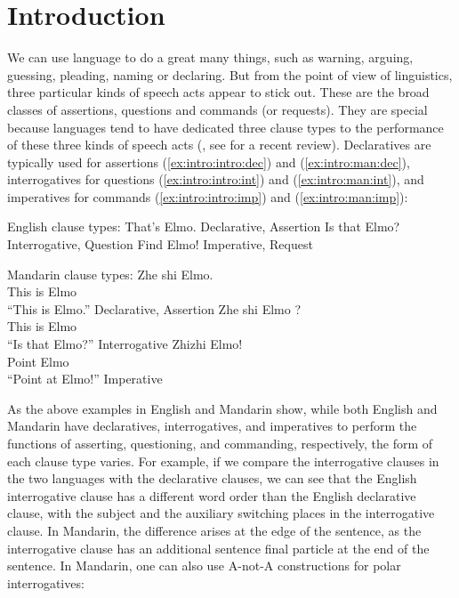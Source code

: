 \chapter{Introduction}
\label{chap:introduction}

We can use language to do a great many things, such as warning, arguing, guessing, pleading, naming or declaring. But from the point of view of linguistics, three particular kinds of speech acts appear to stick out.
These are the broad classes of assertions, questions and commands (or requests). They are special because
languages tend to have dedicated three clause types to the performance of these three kinds of speech acts (\citealt{sz1985speechact, konig2007, aikhenvald2016, portner2018}, see \cite{konig2020} for a recent review). Declaratives are typically used for assertions (\ref{ex:intro:intro:dec}) and (\ref{ex:intro:man:dec}), interrogatives for questions (\ref{ex:intro:intro:int}) and (\ref{ex:intro:man:int}), and imperatives for commands (\ref{ex:intro:intro:imp}) and (\ref{ex:intro:man:imp}):

English clause types:
\bxl \label{ex:intro:intro:dec}
That's Elmo. \hfill Declarative, Assertion
\ex\label{ex:intro:intro:int} Is that Elmo? \hfill Interrogative, Question
\ex\label{ex:intro:intro:imp} Find Elmo! \hfill Imperative, Request
\exl
\eex

Mandarin clause types:
\bxl \label{ex:intro:man:dec}
\gll Zhe shi Elmo.\\
This is Elmo\\
\trans ``This is Elmo.'' \hfill Declarative, Assertion
\ex \label{ex:intro:man:int}
\gll Zhe shi Elmo ?\\
This is Elmo \Sfp\\
\trans ``Is that Elmo?'' \hfill Interrogative
\ex \label{ex:intro:man:imp}
\gll Zhizhi Elmo!\\
Point Elmo\\
\trans ``Point at Elmo!'' \hfill Imperative
\exl
\eex

As the above examples in English and Mandarin show, while both English and Mandarin have declaratives, interrogatives, and imperatives to perform the functions of asserting, questioning, and commanding, respectively, the form of each clause type varies. For example, if we compare the interrogative clauses in the two languages with the declarative clauses, we can see that the English interrogative clause has a different word order than the English declarative clause, with the subject and the auxiliary switching places in the interrogative clause. In Mandarin, the difference arises at the edge of the sentence, as the interrogative clause has an additional sentence final particle  at the end of the sentence. In Mandarin, one can also use A-not-A constructions for polar interrogatives:

